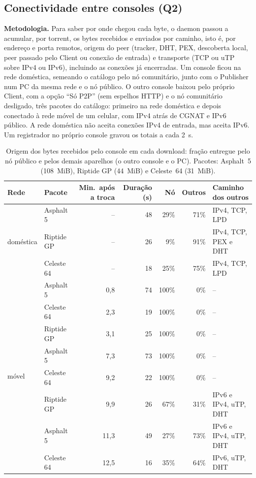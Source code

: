 \documentclass[12pt]{article}
\begin{document}
\subsection{Conectividade entre consoles (Q2)}

\textbf{Metodologia.} Para saber por onde chegou cada byte, o daemon passou a
acumular, por torrent, os bytes recebidos e enviados por caminho, isto é, por
endereço e porta remotos, origem do peer (tracker, DHT, PEX, descoberta local,
peer passado pelo Client ou conexão de entrada) e transporte (TCP ou uTP sobre
IPv4 ou IPv6), incluindo as conexões já encerradas. Um console ficou na rede
doméstica, semeando o catálogo pelo nó comunitário, junto com o Publisher num
PC da mesma rede e o nó público. O outro console baixou pelo próprio Client,
com a opção ``Só P2P'' (sem espelhos HTTP) e o nó comunitário desligado, três
pacotes do catálogo: primeiro na rede doméstica e depois conectado à rede
móvel de um celular, com IPv4 atrás de CGNAT e IPv6 público. A rede doméstica
não aceita conexões IPv4 de entrada, mas aceita IPv6. Um registrador no
próprio console gravou os totais a cada 2~s.

\begin{table}[ht]
\centering
\caption{Origem dos bytes recebidos pelo console em cada download: fração
entregue pelo nó público e pelos demais aparelhos (o outro console e o PC).
Pacotes: Asphalt~5 (108~MiB), Riptide GP (44~MiB) e Celeste~64 (31~MiB).}
\label{tab:conectividade}
\footnotesize
\setlength{\tabcolsep}{4pt}
\begin{tabular}{@{}llrrrrl@{}}
\toprule
Rede & Pacote & Min.\ após a troca & Duração (s) & Nó & Outros & Caminho dos outros \\
\midrule
\multirow{3}{*}{doméstica} & Asphalt 5 & -- & 48 & 29\% & 71\% & IPv4, TCP, LPD \\
 & Riptide GP & -- & 26 & 9\% & 91\% & IPv4, TCP, PEX e DHT \\
 & Celeste 64 & -- & 18 & 25\% & 75\% & IPv4, TCP, LPD \\
\midrule
\multirow{8}{*}{móvel} & Asphalt 5 & 0,8 & 74 & 100\% & 0\% & -- \\
 & Celeste 64 & 2,3 & 19 & 100\% & 0\% & -- \\
 & Riptide GP & 3,1 & 25 & 100\% & 0\% & -- \\
 & Asphalt 5 & 7,3 & 73 & 100\% & 0\% & -- \\
 & Celeste 64 & 9,2 & 22 & 100\% & 0\% & -- \\
 & Riptide GP & 9,9 & 26 & 67\% & 31\% & IPv6 e IPv4, uTP, DHT \\
 & Asphalt 5 & 11,3 & 49 & 27\% & 73\% & IPv6 e IPv4, uTP, DHT \\
 & Celeste 64 & 12,5 & 16 & 35\% & 64\% & IPv6, uTP, DHT \\
\bottomrule
\end{tabular}
\end{table}
\end{document}
